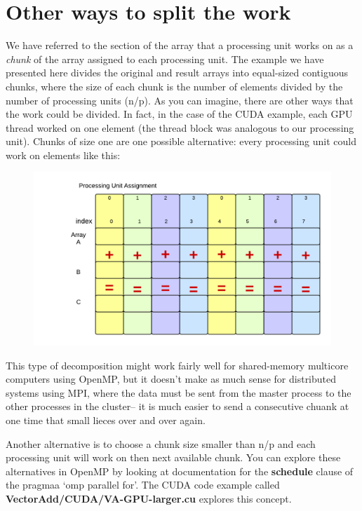 \documentclass[letterpaper,10pt,openany,oneside]{sphinxmanual}
\begin{document}
\chapter{Other ways to split the work}
\label{Decomposition/Variations:other-ways-to-split-the-work}\label{Decomposition/Variations::doc}
We have referred to the section of the array that a processing unit works on as a \emph{chunk} of the array assigned to each processing unit.  The example we have presented here divides the original and result arrays into equal-sized contiguous chunks, where the size of each chunk is the number of elements divided by the number of processing units (n/p).  As you can imagine, there are other ways that the work could be divided.  In fact, in the case of the CUDA example, each GPU thread worked on one element (the thread block was analogous to our processing unit).  Chunks of size one are one possible alternative: every processing unit could work on elements like this:
\begin{figure}[htbp]
\centering

\includegraphics{ChunksOfOne.png}
\end{figure}

This type of decomposition might work fairly well for shared-memory multicore computers using OpenMP, but it doesn't make as much sense for distributed systems using MPI, where the data must be sent from the master process to the other processes in the cluster-- it is much easier to send a consecutive chuank at one time that small lieces over and over again.

Another alternative is to choose a chunk size smaller than n/p and each processing unit will work on then next available chunk.  You can explore these alternatives in OpenMP by looking at documentation for the \textbf{schedule} clause of the pragmaa `omp parallel for'. The CUDA code example called \textbf{VectorAdd/CUDA/VA-GPU-larger.cu} explores this concept.
\end{document}
